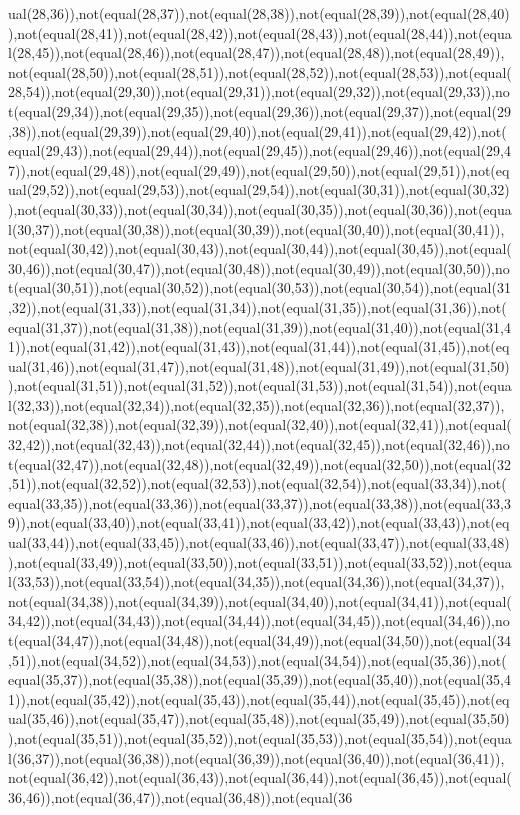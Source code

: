ual(28,36)),not(equal(28,37)),not(equal(28,38)),not(equal(28,39)),not(equal(28,40)),not(equal(28,41)),not(equal(28,42)),not(equal(28,43)),not(equal(28,44)),not(equal(28,45)),not(equal(28,46)),not(equal(28,47)),not(equal(28,48)),not(equal(28,49)),not(equal(28,50)),not(equal(28,51)),not(equal(28,52)),not(equal(28,53)),not(equal(28,54)),not(equal(29,30)),not(equal(29,31)),not(equal(29,32)),not(equal(29,33)),not(equal(29,34)),not(equal(29,35)),not(equal(29,36)),not(equal(29,37)),not(equal(29,38)),not(equal(29,39)),not(equal(29,40)),not(equal(29,41)),not(equal(29,42)),not(equal(29,43)),not(equal(29,44)),not(equal(29,45)),not(equal(29,46)),not(equal(29,47)),not(equal(29,48)),not(equal(29,49)),not(equal(29,50)),not(equal(29,51)),not(equal(29,52)),not(equal(29,53)),not(equal(29,54)),not(equal(30,31)),not(equal(30,32)),not(equal(30,33)),not(equal(30,34)),not(equal(30,35)),not(equal(30,36)),not(equal(30,37)),not(equal(30,38)),not(equal(30,39)),not(equal(30,40)),not(equal(30,41)),not(equal(30,42)),not(equal(30,43)),not(equal(30,44)),not(equal(30,45)),not(equal(30,46)),not(equal(30,47)),not(equal(30,48)),not(equal(30,49)),not(equal(30,50)),not(equal(30,51)),not(equal(30,52)),not(equal(30,53)),not(equal(30,54)),not(equal(31,32)),not(equal(31,33)),not(equal(31,34)),not(equal(31,35)),not(equal(31,36)),not(equal(31,37)),not(equal(31,38)),not(equal(31,39)),not(equal(31,40)),not(equal(31,41)),not(equal(31,42)),not(equal(31,43)),not(equal(31,44)),not(equal(31,45)),not(equal(31,46)),not(equal(31,47)),not(equal(31,48)),not(equal(31,49)),not(equal(31,50)),not(equal(31,51)),not(equal(31,52)),not(equal(31,53)),not(equal(31,54)),not(equal(32,33)),not(equal(32,34)),not(equal(32,35)),not(equal(32,36)),not(equal(32,37)),not(equal(32,38)),not(equal(32,39)),not(equal(32,40)),not(equal(32,41)),not(equal(32,42)),not(equal(32,43)),not(equal(32,44)),not(equal(32,45)),not(equal(32,46)),not(equal(32,47)),not(equal(32,48)),not(equal(32,49)),not(equal(32,50)),not(equal(32,51)),not(equal(32,52)),not(equal(32,53)),not(equal(32,54)),not(equal(33,34)),not(equal(33,35)),not(equal(33,36)),not(equal(33,37)),not(equal(33,38)),not(equal(33,39)),not(equal(33,40)),not(equal(33,41)),not(equal(33,42)),not(equal(33,43)),not(equal(33,44)),not(equal(33,45)),not(equal(33,46)),not(equal(33,47)),not(equal(33,48)),not(equal(33,49)),not(equal(33,50)),not(equal(33,51)),not(equal(33,52)),not(equal(33,53)),not(equal(33,54)),not(equal(34,35)),not(equal(34,36)),not(equal(34,37)),not(equal(34,38)),not(equal(34,39)),not(equal(34,40)),not(equal(34,41)),not(equal(34,42)),not(equal(34,43)),not(equal(34,44)),not(equal(34,45)),not(equal(34,46)),not(equal(34,47)),not(equal(34,48)),not(equal(34,49)),not(equal(34,50)),not(equal(34,51)),not(equal(34,52)),not(equal(34,53)),not(equal(34,54)),not(equal(35,36)),not(equal(35,37)),not(equal(35,38)),not(equal(35,39)),not(equal(35,40)),not(equal(35,41)),not(equal(35,42)),not(equal(35,43)),not(equal(35,44)),not(equal(35,45)),not(equal(35,46)),not(equal(35,47)),not(equal(35,48)),not(equal(35,49)),not(equal(35,50)),not(equal(35,51)),not(equal(35,52)),not(equal(35,53)),not(equal(35,54)),not(equal(36,37)),not(equal(36,38)),not(equal(36,39)),not(equal(36,40)),not(equal(36,41)),not(equal(36,42)),not(equal(36,43)),not(equal(36,44)),not(equal(36,45)),not(equal(36,46)),not(equal(36,47)),not(equal(36,48)),not(equal(36